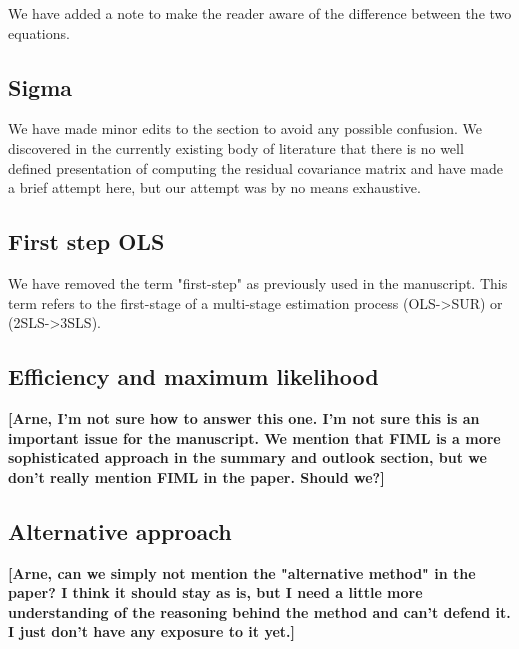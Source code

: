 \documentclass[12pt,english]{scrartcl}
\begin{document}
We have added a note to make the reader aware of the difference
between the two equations. 

\subsection{Sigma}

We have made minor edits to the section to avoid any possible
confusion. We discovered in the currently existing body of literature
that there is no well defined presentation of computing the residual
covariance matrix and have made a brief attempt here, but our attempt
was by no means exhaustive. 

\subsection{First step OLS}

We have removed the term "first-step" as previously used in the
manuscript. This term refers to the first-stage of a multi-stage
estimation process (OLS->SUR) or (2SLS->3SLS).

\subsection{Efficiency and maximum likelihood}

\textbf{[Arne, I'm not sure how to answer this one. I'm not sure this is an
important issue for the manuscript. We mention that FIML is a more
sophisticated approach in the summary and outlook section, but we
don't really mention FIML in the paper. Should we?]}


\subsection{Alternative approach}

\textbf{[Arne, can we simply not mention the "alternative method" in the
paper? I think it should stay as is, but I need a little more
understanding of the reasoning behind the method and can't defend
it. I just don't have any exposure to it yet.]}
\end{document}

